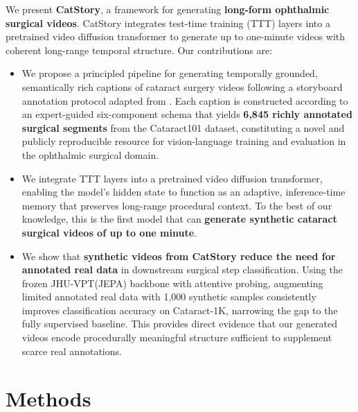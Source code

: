 \documentclass[runningheads]{llncs}
\begin{document}
We present \textbf{CatStory}, a framework for generating \textbf{long-form ophthalmic surgical videos}. CatStory integrates test-time training (TTT) layers\cite{dalal2025oneminutevideogenerationtesttime} into a pretrained video diffusion transformer to generate up to one-minute videos with coherent long-range temporal structure. Our contributions are:
\begin{itemize}
    \item We propose a principled pipeline for generating temporally grounded, semantically rich captions of cataract surgery videos following a storyboard annotation protocol adapted from \cite{dalal2025oneminutevideogenerationtesttime}. Each caption is constructed according to an expert-guided six-component schema that yields \textbf{6,845 richly annotated surgical segments} from the Cataract101 dataset, constituting a novel and publicly reproducible resource for vision-language training and evaluation in the ophthalmic surgical domain.
    \item We integrate TTT layers into a pretrained video diffusion transformer, enabling the model's hidden state to function as an adaptive, inference-time memory that preserves long-range procedural context. To the best of our knowledge, this is the first model that can \textbf{generate synthetic cataract surgical videos of up to one minute}. 
    \item We show that \textbf{synthetic videos from CatStory reduce the need for annotated real data} in downstream surgical step classification. Using the frozen JHU-VPT(JEPA)\cite{shah2025vision} backbone with attentive probing, augmenting limited annotated real data with 1,000 synthetic samples consistently improves classification accuracy on Cataract-1K, narrowing the gap to the fully supervised baseline. This provides direct evidence that our generated videos encode procedurally meaningful structure sufficient to supplement scarce real annotations.
\end{itemize}

\section{Methods}
\end{document}
